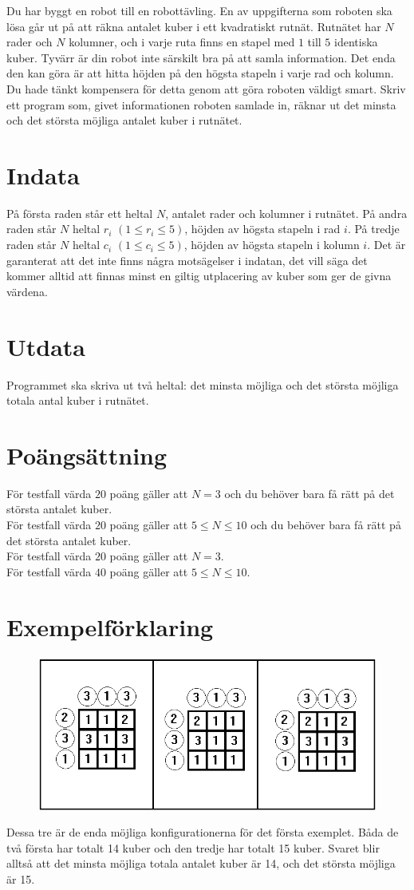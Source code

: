 
Du har byggt en robot till en robottävling. En av uppgifterna som roboten ska lösa går ut på att räkna antalet kuber i ett kvadratiskt rutnät. Rutnätet har $N$ rader och $N$ kolumner, och i varje ruta finns en stapel med $1$ till $5$ identiska kuber. Tyvärr är din robot inte särskilt bra på att samla information. Det enda den kan göra är att hitta höjden på den högsta stapeln i varje rad och kolumn. Du hade tänkt kompensera för detta genom att göra roboten väldigt smart. Skriv ett program som, givet informationen roboten samlade in, räknar ut det minsta och det största möjliga antalet kuber i rutnätet.

\section*{Indata}
På första raden står ett heltal $N$, antalet rader och kolumner i rutnätet. På andra raden står $N$ heltal $r_i$ $(1 \leq r_i \leq 5)$, höjden av högsta stapeln i rad $i$. På tredje raden står $N$ heltal $c_i$ $(1 \leq c_i \leq 5)$, höjden av högsta stapeln i kolumn $i$. Det är garanterat att det inte finns några motsägelser i indatan, det vill säga det kommer alltid att finnas minst en giltig utplacering av kuber som ger de givna värdena.
\section*{Utdata}
Programmet ska skriva ut två heltal: det minsta möjliga och det största möjliga totala antal kuber i rutnätet.


\section*{Poängsättning}
För testfall värda $20$ poäng gäller att $N=3$  och du behöver bara få rätt på det största antalet kuber. \\
För testfall värda $20$ poäng gäller att  $5\le N\le 10$   och du behöver bara få rätt på det största antalet kuber.\\
För testfall värda $20$ poäng gäller att  $N=3$.  \\
För testfall värda $40$ poäng gäller att  $5 \le N \le 10.$ \\

\section*{Exempelförklaring}
\begin{figure}[!h]
  \centering
      \includegraphics[width=.5\textwidth]{robotbild.png}
\end{figure}
Dessa tre är de enda möjliga konfigurationerna för det första exemplet. Båda de två första har totalt 14 kuber och den tredje har totalt 15 kuber. Svaret blir alltså att det minsta möjliga totala antalet kuber är 14, och det största möjliga är 15.
